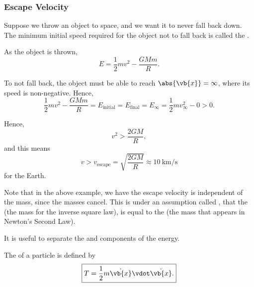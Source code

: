 \subsubsection{Escape Velocity}

\begin{example}
    \label{ex:object-thrown-to-space}%
    Suppose we throw an object to space, and we want it to never fall back down. The minimum initial speed required for the object not to fall back is called the .

    As the object is thrown,
    \begin{equation}
        E = \frac{1}{2} m v^2 - \frac{G M m}{R}.
    \end{equation}

    To not fall back, the object must be able to reach \(\abs{\vb{x}} = \infty\), where its speed is non-negative. Hence,
    \begin{equation}
        \frac{1}{2} m v^2 - \frac{G M m}{R} = E_{\text{initial}} = E_{\text{final}} = E_{\infty} = \frac{1}{2} m v_\infty^2 - 0 > 0.
    \end{equation}

    Hence,
    \begin{equation}
        \boxed{v^2 > \frac{2GM}{R},}
    \end{equation}
    and this means
    \begin{equation}
        v > \boxed{v_{\text{escape}} = \sqrt{\frac{2GM}{R}}} \approx \SI{10}{\kilo\metre\per\second}
    \end{equation}
    for the Earth.
\end{example}

\begin{remark}
    Note that in the above example, we have the escape velocity is independent of the mass, since the masses cancel. This is under an assumption called , that the  (the mass for the inverse square law), is equal to the  (the mass that appears in Newton's Second Law).
\end{remark}

It is useful to separate the  and  components of the energy.

\begin{definition}
    \label{def:kinetic-energy}%
    The  of a particle is defined by
    \begin{equation}
        \boxed{T = \frac{1}{2} m \dot{\vb{x}} \vdot \dot{\vb{x}}.}
    \end{equation}
\end{definition}

